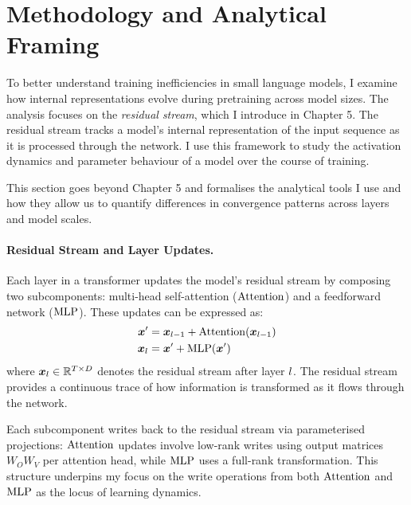 \section{Methodology and Analytical Framing}
\label{sec:methodology}

To better understand training inefficiencies in small language models, I examine how internal representations evolve during pretraining across model sizes. The analysis focuses on the \textit{residual stream}, which I introduce in Chapter 5. The residual stream tracks a model's internal representation of the input sequence as it is processed through the network. I use this framework to study the activation dynamics and parameter behaviour of a model over the course of training.

This section goes beyond Chapter 5 and formalises the analytical tools I use and how they allow us to quantify differences in convergence patterns across layers and model scales.

\paragraph{Residual Stream and Layer Updates.}
Each layer in a transformer updates the model's residual stream by composing two subcomponents: multi-head self-attention ($\mathrm{Attention}$) and a feedforward network ($\mathrm{MLP}$). These updates can be expressed as:
\begin{align}
    \boldsymbol{x}' &= \boldsymbol{x}_{l-1} + \mathrm{Attention}(\boldsymbol{x}_{l-1}) \\
    \boldsymbol{x}_{l} &= \boldsymbol{x}' + \mathrm{MLP}(\boldsymbol{x}')
\end{align}
where $\boldsymbol{x}_{l} \in \mathbb{R}^{T \times D}$ denotes the residual stream after layer $l$. The residual stream provides a continuous trace of how information is transformed as it flows through the network.

Each subcomponent writes back to the residual stream via parameterised projections: $\mathrm{Attention}$ updates involve low-rank writes using output matrices $W_O W_V$ per attention head, while $\mathrm{MLP}$ uses a full-rank transformation. This structure underpins my focus on the write operations from both $\mathrm{Attention}$ and $\mathrm{MLP}$ as the locus of learning dynamics.

